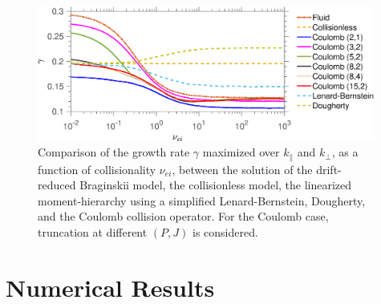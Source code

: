 
\begin{figure}
 \centering
 \includegraphics[width=0.99\textwidth]{images/DWscan_gammaPeak_convergence.eps}
 \caption{Comparison of the growth rate $\gamma$ maximized over $k_\parallel$ and $k_\perp$, as a function of collisionality $\nu_{ei}$, between the solution of the drift-reduced Braginskii model, the collisionless model, the linearized moment-hierarchy using a simplified Lenard-Bernstein, Dougherty, and the Coulomb collision operator. For the Coulomb case, truncation at different $(P,J)$ is considered.}
 \label{fig:dwcoulb}
\end{figure}

\section{Numerical Results}
\label{sec:dwnumericalresults}

